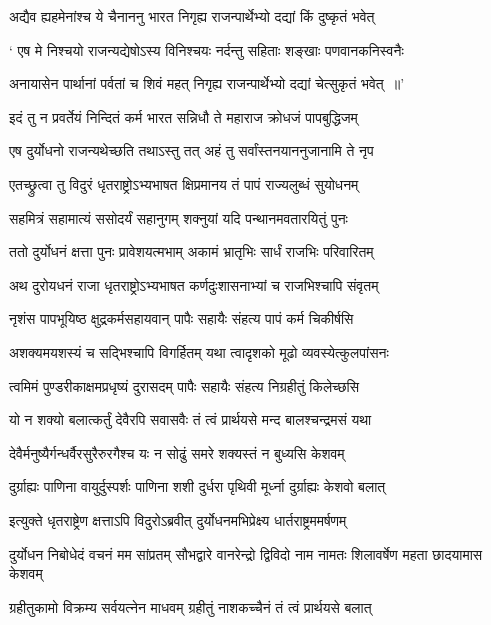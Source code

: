 \twolineshloka
{अद्यैव ह्यहमेनांश्च ये चैनाननु भारत}
{निगृह्य राजन्पार्थेभ्यो दद्यां किं दुष्कृतं भवेत्}


\twolineshloka
{` एष मे निश्चयो राजन्यद्येषोऽस्य विनिश्चयः}
{नर्दन्तु सहिताः शङ्खाः पणवानकनिस्वनैः}


\twolineshloka
{अनायासेन पार्थानां पर्वतां च शिवं महत्}
{निगृह्य राजन्पार्थेभ्यो दद्यां चेत्सुकृतं भवेत् ॥'}


\twolineshloka
{इदं तु न प्रवर्तेयं निन्दितं कर्म भारत}
{सन्निधौ ते महाराज क्रोधजं पापबुद्धिजम्}


\twolineshloka
{एष दुर्योधनो राजन्यथेच्छति तथाऽस्तु तत्}
{अहं तु सर्वांस्तनयाननुजानामि ते नृप}


\twolineshloka
{एतच्छ्रुत्वा तु विदुरं धृतराष्ट्रोऽभ्यभाषत}
{क्षिप्रमानय तं पापं राज्यलुब्धं सुयोधनम्}


\twolineshloka
{सहमित्रं सहामात्यं ससोदर्यं सहानुगम्}
{शक्नुयां यदि पन्थानमवतारयितुं पुनः}


\twolineshloka
{ततो दुर्योधनं क्षत्ता पुनः प्रावेशयत्मभाम्}
{अकामं भ्रातृभिः सार्धं राजभिः परिवारितम्}


\twolineshloka
{अथ दुरोयधनं राजा धृतराष्ट्रोऽभ्यभाषत}
{कर्णदुःशासनाभ्यां च राजभिश्चापि संवृतम्}


\twolineshloka
{नृशंस पापभूयिष्ठ क्षुद्रकर्मसहायवान्}
{पापैः सहायैः संहत्य पापं कर्म चिकीर्षसि}


\twolineshloka
{अशक्यमयशस्यं च सद्भिश्चापि विगर्हितम्}
{यथा त्वादृशको मूढो व्यवस्येत्कुलपांसनः}


\twolineshloka
{त्वमिमं पुण्डरीकाक्षमप्रधृष्यं दुरासदम्}
{पापैः सहायैः संहत्य निग्रहीतुं किलेच्छसि}


\twolineshloka
{यो न शक्यो बलात्कर्तुं देवैरपि सवासवैः}
{तं त्वं प्रार्थयसे मन्द बालश्चन्द्रमसं यथा}


\twolineshloka
{देवैर्मनुष्यैर्गन्धर्वैरसुरैरुरगैश्च यः}
{न सोढुं समरे शक्यस्तं न बुध्यसि केशवम्}


\twolineshloka
{दुर्ग्राह्यः पाणिना वायुर्दुस्पर्शः पाणिना शशी}
{दुर्धरा पृथिवी मूर्ध्ना दुर्ग्राह्यः केशवो बलात्}


\twolineshloka
{इत्युक्ते धृतराष्ट्रेण क्षत्ताऽपि विदुरोऽब्रवीत्}
{दुर्योधनमभिप्रेक्ष्य धार्तराष्ट्रममर्षणम्}


\threelineshloka
{दुर्योधन निबोधेदं वचनं मम सांप्रतम्}
{सौभद्वारे वानरेन्द्रो द्विविदो नाम नामतः}
{शिलावर्षेण महता छादयामास केशवम्}


\twolineshloka
{ग्रहीतुकामो विक्रम्य सर्वयत्नेन माधवम्}
{ग्रहीतुं नाशकच्चैनं तं त्वं प्रार्थयसे बलात्}


